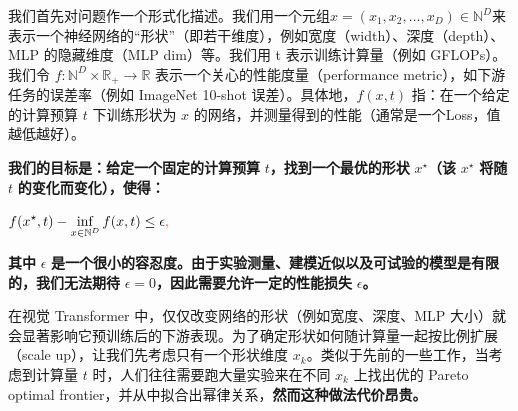 \documentclass[zihao=false,fontset=windows]{ctexart}
\newcommand{\bigmath}[1]{%
  \begin{center}\large$\displaystyle #1$\end{center}%
}
\begin{document}
\par{}\vspace{1em}\par\vspace{0.28em}

我们首先对问题作一个形式化描述。我们用一个元组$x=(x_1,x_2,\ldots,x_D)\in\mathbb N^D$来表示一个神经网络的“形状”（即若干维度），例如宽度（width）、深度（depth）、MLP 的隐藏维度（MLP dim）等。我们用 t 表示训练计算量（例如 GFLOPs）。我们令 $f:\mathbb N^D\times\mathbb R_+\to\mathbb R$ 表示一个关心的性能度量（performance metric），如下游任务的误差率（例如 ImageNet 10-shot 误差）。具体地，$f(x,t)$ 指：在一个给定的计算预算 $t$ 下训练形状为 $x$ 的网络，并测量得到的性能（通常是一个Loss，值越低越好）。\par

\textcolor{feishuRed}{\textbf{我们的目标是：给定一个固定的计算预算 }}{\boldmath$t$}\textcolor{feishuRed}{\textbf{，找到一个最优的形状 }}{\boldmath$x^\star$}\textcolor{feishuRed}{\textbf{（该 }}{\boldmath$x^\star$}\textcolor{feishuRed}{\textbf{ 将随 }}{\boldmath$t$}\textcolor{feishuRed}{\textbf{ 的变化而变化），使得：}}\par

{\boldmath\bigmath{f(x^\star,t)-\inf_{x\in\mathbb N^D}f(x,t)\leq\epsilon\textcolor{feishuRed}{,}}}

\textcolor{feishuRed}{\textbf{其中 }}{\boldmath$\epsilon$}\textcolor{feishuRed}{\textbf{ 是一个很小的容忍度。由于实验测量、建模近似以及可试验的模型是有限的，我们无法期待 }}{\boldmath$\epsilon=0$}\textcolor{feishuRed}{\textbf{，因此需要允许一定的性能损失 }}{\boldmath$\epsilon$}\textcolor{feishuRed}{\textbf{。}}\par

\par{}\vspace{1em}\par\vspace{0.28em}

在视觉 Transformer 中，仅仅改变网络的形状（例如宽度、深度、MLP 大小）就会显著影响它预训练后的下游表现。为了确定形状如何随计算量一起按比例扩展（scale up），让我们先考虑只有一个形状维度 $x_k$。类似于先前的一些工作，当考虑到计算量 $t$ 时，人们往往需要跑大量实验来在不同 $x_k$ 上找出优的 Pareto optimal frontier，并从中拟合出幂律关系，\textbf{然而这种做法代价昂贵。}\par
\end{document}
